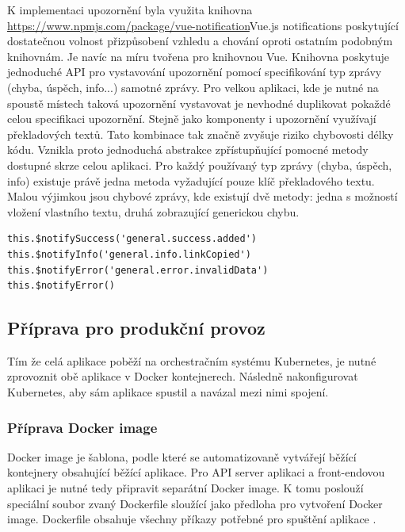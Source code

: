 		K implementaci upozornění byla využita knihovna \url{https://www.npmjs.com/package/vue-notification}{Vue.js notifications}
		poskytující dostatečnou volnost přizpůsobení vzhledu a chování oproti ostatním podobným knihovnám.
		Je navíc na míru tvořena pro knihovnou Vue.
		Knihovna poskytuje jednoduché \ac{API} pro vystavování upozornění pomocí specifikování typ zprávy (chyba, úspěch, info...)
		samotné zprávy.
		Pro velkou aplikaci, kde je nutné na spoustě místech taková upozornění vystavovat je nevhodné duplikovat
		pokaždé celou specifikaci upozornění.
		Stejně jako komponenty i upozornění využívají překladových textů.
		Tato kombinace tak značně zvyšuje riziko chybovosti délky kódu.
		Vznikla proto jednoduchá abstrakce zpřístupňující pomocné metody dostupné skrze celou aplikaci.
		Pro každý používaný typ zprávy (chyba, úspěch, info) existuje právě jedna metoda vyžadující pouze klíč překladového textu.
		Malou výjimkou jsou chybové zprávy, kde existují dvě metody: jedna s možností vložení vlastního textu, druhá
		zobrazující generickou chybu.

		\begin{lstlisting}[caption={Implementované pomocné metody pro vystavení různých typů upozornění. Zdroj: [autor]}]
this.$notifySuccess('general.success.added')
this.$notifyInfo('general.info.linkCopied')
this.$notifyError('general.error.invalidData')
this.$notifyError()
		\end{lstlisting}

	\subsection{Příprava pro produkční provoz}

	Tím že celá aplikace poběží na orchestračním systému Kubernetes, je nutné zprovoznit obě aplikace v Docker kontejnerech.
	Následně nakonfigurovat Kubernetes, aby sám aplikace spustil a navázal mezi nimi spojení.

		\subsubsection{Příprava Docker image}

		Docker image je šablona, podle které se automatizovaně vytvářejí běžící kontejnery obsahující běžící aplikace.
		Pro \ac{API} server aplikaci a front-endovou aplikaci je nutné tedy připravit separátní Docker image.
		K tomu poslouží speciální soubor zvaný Dockerfile sloužící jako předloha pro vytvoření Docker image.
		Dockerfile obsahuje všechny příkazy potřebné pro spuštění aplikace \cite{dockerfile_reference}.

